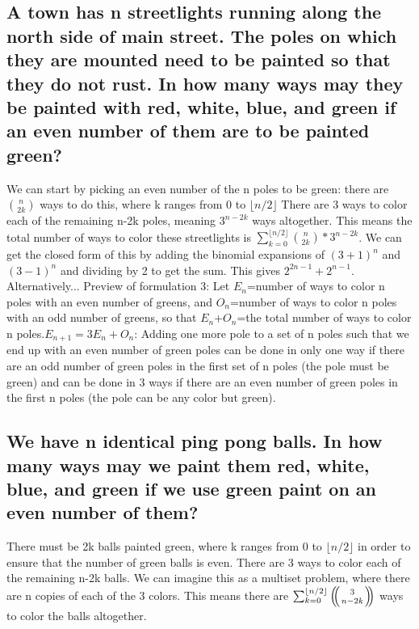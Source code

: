 \subsection{A town has n streetlights running along the north side of main street. The poles on which they are mounted need to be painted so that they do not rust. In how many ways may they be painted with red, white, blue, and green if an even number of them are to be painted green?}
We can start by picking an even number of the n poles to be green: there are $\binom{n}{2k}$ ways to do this, where k ranges from 0 to ${\lfloor {n/2} \rfloor}$ There are 3 ways to color each of the remaining n-2k poles, meaning $3^{n-2k}$ ways altogether. This means the total number of ways to color these streetlights is $\sum_{k=0}^{\lfloor{n/2} \rfloor} {\binom{n}{2k} * 3^{n-2k}}$. We can get the closed form of this by adding the binomial expansions of $(3+1)^n$ and $(3-1)^n$ and dividing by 2 to get the sum. This gives $2^{2n-1}+2^{n-1}$. 
\newline
Alternatively...
\newline
Preview of formulation 3:
\newline
Let $E_n$=number of ways to color n poles with an even number of greens, and $O_n$=number of ways to color n poles with an odd number of greens, so that $E_n$+$O_n$=the total number of ways to color n poles.$E_{n+1}=3E_n+O_n$: Adding one more pole to a set of n poles such that we end up with an even number of green poles can be done in only one way if there are an odd number of green poles in the first set of n poles (the pole must be green) and can be done in 3 ways if there are an even number of green poles in the first n poles (the pole can be any color but green). 


\subsection{We have n identical ping pong balls. In how many ways may we paint them red, white, blue, and green if we use green paint on an even number of them?}
There must be 2k balls painted green, where k ranges from 0 to ${\lfloor n/2 \rfloor}$ in order to ensure that the number of green balls is even. There are 3 ways to color each of the remaining n-2k balls. We can imagine this as a multiset problem, where there are n copies of each of the 3 colors. This means there are \(\sum_{k=0}^{\lfloor n/2 \rfloor} \multiset{3}{n-2k}\) ways to color the balls altogether. 

